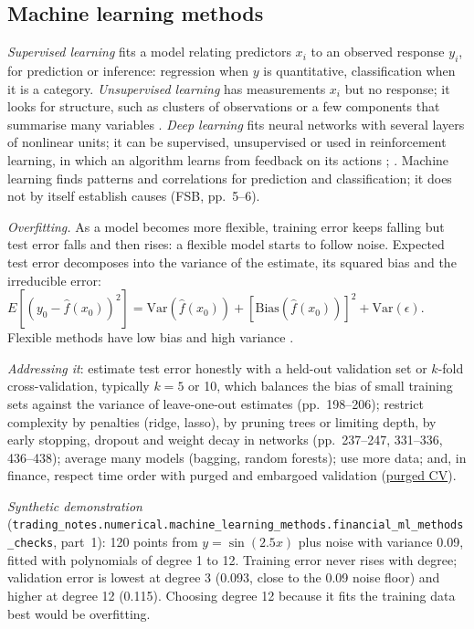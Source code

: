 \subsection{Machine learning methods}

\begin{qfdefinition}\label{def:learning-methods-overfitting}
 \emph{Supervised learning} fits a model relating predictors $x_i$ to an observed response $y_i$, for prediction or inference: regression when $y$ is quantitative, classification when it is a category. \emph{Unsupervised learning} has measurements $x_i$ but no response; it looks for structure, such as clusters of observations or a few components that summarise many variables \citep[pp.~26--27]{s6-isl}. \emph{Deep learning} fits neural networks with several layers of nonlinear units; it can be supervised, unsupervised or used in reinforcement learning, in which an algorithm learns from feedback on its actions \citep[pp.~5--6]{fsb-ai-ml-2017}; \citep[pp.~403--407]{s6-isl}. Machine learning finds patterns and correlations for prediction and classification; it does not by itself establish causes (FSB, pp.~5--6).

\emph{Overfitting.} As a model becomes more flexible, training error keeps falling but test error falls and then rises: a flexible model starts to follow noise. Expected test error decomposes into the variance of the estimate, its squared bias and the irreducible error: $E[(y_0-\hat f(x_0))^2]=\mathrm{Var}(\hat f(x_0))+[\mathrm{Bias}(\hat f(x_0))]^2+\mathrm{Var}(\epsilon)$. Flexible methods have low bias and high variance \citep[pp.~31--36]{s6-isl}.

\emph{Addressing it}: estimate test error honestly with a held-out validation set or $k$-fold cross-validation, typically $k=5$ or 10, which balances the bias of small training sets against the variance of leave-one-out estimates (pp.~198--206); restrict complexity by penalties (ridge, lasso), by pruning trees or limiting depth, by early stopping, dropout and weight decay in networks (pp.~237--247, 331--336, 436--438); average many models (bagging, random forests); use more data; and, in finance, respect time order with purged and embargoed validation (\hyperref[meth:purged-embargoed-cross-validation]{purged CV}).

 \emph{Synthetic demonstration} (\nolinkurl{trading_notes.numerical.machine_learning_methods.financial_ml_methods_checks}, part~1): 120 points from $y=\sin(2.5x)$ plus noise with variance 0.09, fitted with polynomials of degree 1 to 12. Training error never rises with degree; validation error is lowest at degree 3 (0.093, close to the 0.09 noise floor) and higher at degree 12 (0.115). Choosing degree 12 because it fits the training data best would be overfitting.


\end{qfdefinition}
